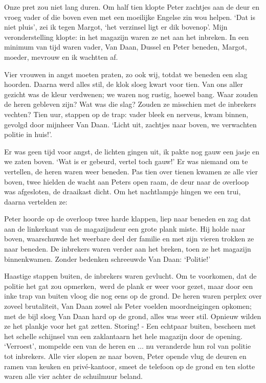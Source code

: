 \documentclass{book}
\begin{document}
Onze pret zou niet lang duren. Om half tien klopte Peter zachtjes aan de deur en
vroeg vader of die boven even met een moeilijke Engelse zin wou helpen. `Dat is
niet pluis', zei ik tegen Margot, `het verzinsel ligt er dik bovenop'. Mijn
veronderstelling klopte: in het magazijn waren ze net aan het inbreken. In een
minimum van tijd waren vader, Van Daan, Dussel en Peter beneden, Margot, moeder,
mevrouw en ik wachtten af.

Vier vrouwen in angst moeten praten, zo ook wij, totdat we beneden een slag
hoorden. Daarna werd alles stil, de klok sloeg kwart voor tien. Van ons aller
gezicht was de kleur verdwenen; we waren nog rustig, hoewel bang. Waar zouden de
heren gebleven zijn? Wat was die slag? Zouden ze misschien met de inbrekers
vechten? Tien uur, stappen op de trap: vader bleek en nerveus, kwam binnen,
gevolgd door mijnheer Van Daan. `Licht uit, zachtjes naar boven, we verwachten
politie in huis!'.

Er was geen tijd voor angst, de lichten gingen uit, ik pakte nog gauw een jasje
en we zaten boven. `Wat is er gebeurd, vertel toch gauw!' Er was niemand om te
vertellen, de heren waren weer beneden. Pas tien over tienen kwamen ze alle vier
boven, twee hielden de wacht aan Peters open raam, de deur naar de overloop was
afgesloten, de draaikast dicht. Om het nachtlampje hingen we een trui, daarna
vertelden ze:

Peter hoorde op de overloop twee harde klappen, liep naar beneden en zag dat aan
de linkerkant van de magazijndeur een grote plank miste. Hij holde naar boven,
waarschuwde het weerbare deel der familie en met zijn vieren trokken ze naar
beneden. De inbrekers waren verder aan het breken, toen ze het magazijn
binnenkwamen. Zonder bedenken schreeuwde Van Daan: `Politie!'

Haastige stappen buiten, de inbrekers waren gevlucht. Om te voorkomen, dat de
politie het gat zou opmerken,~werd de plank er weer voor gezet, maar door een
inke trap van buiten vloog die nog eens op de grond. De heren waren perplex over
zoveel brutaliteit, Van Daan zowel als Peter voelden moordneigingen opkomen; met
de bijl sloeg Van Daan hard op de grond, alles was weer stil. Opnieuw wilden ze
het plankje voor het gat zetten. Storing! - Een echtpaar buiten, bescheen met
het schelle schijnsel van een zaklantaarn het hele magazijn door de opening.
`Verroest', mompelde een van de heren en ... nu veranderde hun rol van politie
tot inbrekers. Alle vier slopen ze naar boven, Peter opende vlug de deuren en
ramen van keuken en privé-kantoor, smeet de telefoon op de grond en ten slotte
waren alle vier achter de schuilmuur beland.
\end{document}
